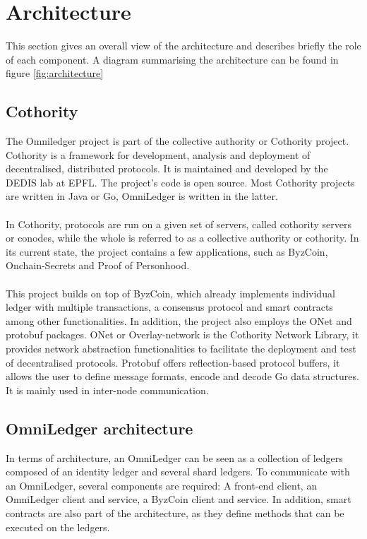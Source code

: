 \section{Architecture}
 This section gives an overall view of the architecture and describes briefly the role of each component. A diagram summarising the architecture can be found in figure \ref{fig:architecture}

\subsection{Cothority}
The Omniledger project is part of the collective authority or Cothority project\cite{cothority}. Cothority is a framework for development, analysis and deployment of decentralised, distributed protocols. It is maintained and developed by the DEDIS lab at EPFL. The project's code is open source. Most Cothority projects are written in Java or Go, OmniLedger is written in the latter. \\\\
In Cothority, protocols are run on a given set of servers, called cothority servers or conodes, while the whole is referred to as a collective authority or cothority. In its current state, the project contains a few applications, such as ByzCoin, Onchain-Secrets and Proof of Personhood. \\\\
This project builds on top of ByzCoin, which already implements individual ledger with multiple transactions, a consensus protocol and smart contracts among other functionalities. In addition, the project also employs the ONet\cite{onet} and protobuf\cite{protobuf} packages. ONet or Overlay-network is the Cothority Network Library, it provides network abstraction functionalities to facilitate the deployment and test of decentralised protocols. Protobuf offers reflection-based protocol buffers, it allows the user to define message formats, encode and decode Go data structures. It is mainly used in inter-node communication.

\subsection{OmniLedger architecture}
In terms of architecture, an OmniLedger can be seen as a collection of ledgers composed of an identity ledger and several shard ledgers. To communicate with an OmniLedger, several components are required: A front-end client, an OmniLedger client and service, a ByzCoin client and service. In addition, smart contracts are also part of the architecture, as they define methods that can be executed on the ledgers.

